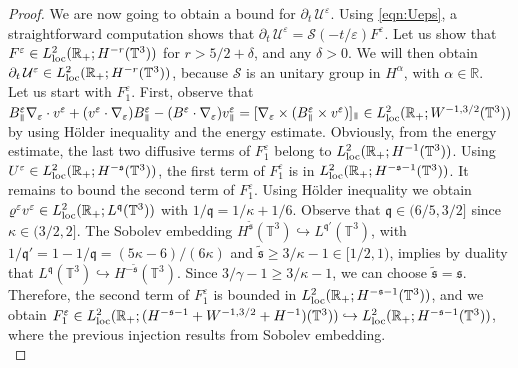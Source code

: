 \documentclass[11pt,reqno]{amsart}
\def \R{{\mathbb{R}}}
\def \T{{\mathbb{T}}}
\newcommand{\myparallel}{{\mkern3mu\vphantom{\perp}\vrule depth 0pt\mkern2mu\vrule depth 0pt\mkern3mu}}
\begin{document}
\begin{proof}
  We are now going to obtain a bound for $\partial_t \, \mathcal U^\varepsilon $. Using \eqref{eqn:Ueps}, a straightforward computation shows that $\partial_t \, \mathcal U^\varepsilon =\mathcal S(-t/\varepsilon)F^\varepsilon $. Let us show that $F^\varepsilon \in  L_{\rm loc}^{2}(\R_+; H^{-r}(\T^3))$ for $r>5/2+\delta$, and any $\delta >0$. We will then  obtain $ \partial_t \, \mathcal U^\varepsilon \in  L_{\rm loc}^{2}(\R_+; H^{-r}(\T^3))$, because $\mathcal S$ is an unitary group in $H^{\alpha}$, with $\alpha\in \R$. \\
  Let us start with $F_1^\varepsilon$. First, observe that
  $B_\myparallel^\varepsilon  \nabla_\varepsilon \cdot v^\varepsilon + (v^\varepsilon\cdot\nabla_\varepsilon)B_\myparallel^\varepsilon - (B^\varepsilon\cdot\nabla_\varepsilon) v_\myparallel^\varepsilon=[\nabla_\varepsilon \times (B_\myparallel^\varepsilon \times v^\varepsilon)]_{\myparallel} \in L_{\rm loc}^{2}(\R_+; W^{-1,3/2}(\T^3))$ by using H\"older inequality and the energy estimate. Obviously, from the energy estimate, the last two diffusive terms of $F_1^\varepsilon$ belong to $L_{\rm loc}^{2}(\R_+; H^{-1}(\T^3))$. Using $U^\varepsilon \in L_{\rm loc}^{2}(\R_+; H^{-\mathfrak s}(\T^3))$, the first term of $F_1^\varepsilon$ is in $L_{\rm loc}^{2}(\R_+; H^{-\mathfrak s-1}(\T^3))$. It remains to bound the second term of $F_1^\varepsilon$. Using H\"older inequality we obtain $\varrho^\varepsilon v^\varepsilon \in L_{\rm loc}^2(\R_+; L^{\mathfrak q}(\T^3))$ with $1/\mathfrak q =1/\kappa + 1/6$. Observe that $\mathfrak q \in (6/5, 3/2]$ since $\kappa \in (3/2,2]$. The Sobolev embedding $ H^{ \tilde{\mathfrak{s}}}(\T^3) \hookrightarrow L^{\mathfrak q'}(\T^3)$, with $1/\mathfrak q'=1-1/\mathfrak q=(5\kappa -6)/(6\kappa)$ and $\tilde{\mathfrak s} \geq 3/\kappa-1\in [1/2,1)$, implies by duality that $L^{\mathfrak q} (\T^3) \hookrightarrow H^{-\tilde{\mathfrak s}}(\T^3)$. Since  $  3/\gamma-1\geq 3/\kappa-1 $, we can choose $\tilde{\mathfrak s} = \mathfrak s$. Therefore, the second term of $F_1^\varepsilon$ is bounded in $L_{\rm loc}^{2}(\R_+; H^{-\mathfrak s-1}(\T^3))$, and we obtain $F_1^\varepsilon \in  L_{\rm loc}^{2}(\R_+; (H^{-\mathfrak s-1}+ W^{-1,3/2} + H^{-1})(\T^3)) \hookrightarrow  L_{\rm loc}^{2}(\R_+; H^{-\mathfrak s-1}(\T^3))$, where the previous injection results from Sobolev embedding.\\

\end{proof}
\end{document}
